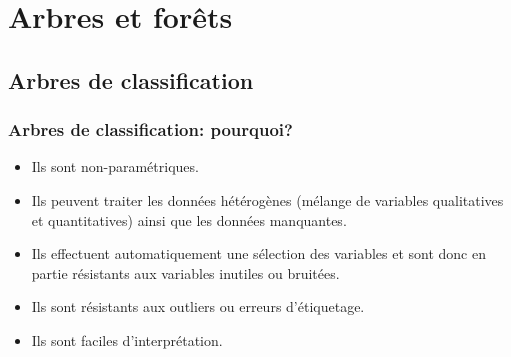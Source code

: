 \documentclass[dvipsnames,10pt]{beamer}
\theoremstyle{plain}
\theoremstyle{definition}
\begin{document}
\section{Arbres et forêts}
\subsection{Arbres de classification}

\begin{frame}
\frametitle{Arbres de classification: pourquoi?}
\begin{itemize}
    \item Ils sont non-paramétriques.
    \item Ils peuvent traiter les données hétérogènes (mélange de variables qualitatives et quantitatives) ainsi que les données manquantes.
    \item Ils effectuent automatiquement une sélection des variables et sont donc en partie résistants aux variables inutiles ou bruitées.
    \item Ils sont résistants aux outliers ou erreurs d'étiquetage.
    \item Ils sont faciles d'interprétation.
\end{itemize}
\end{frame}
\end{document}
